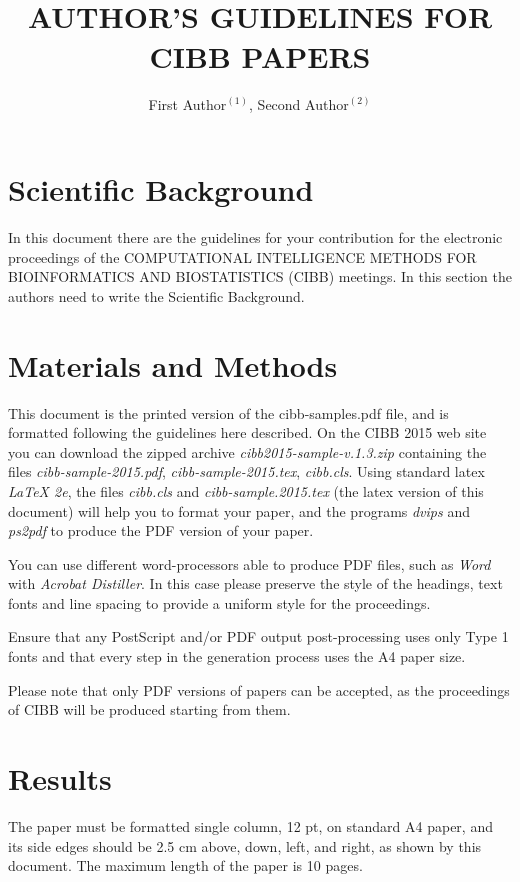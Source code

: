\documentclass[12pt,a4paper]{cibb}
\title{\large $\ $\\ \bf AUTHOR'S GUIDELINES FOR CIBB PAPERS}
\author{ First Author$^{(1)}$, Second Author$^{(2)}$}
\begin{document}
\thispagestyle{myheadings}
\pagestyle{myheadings}



\section{\bf Scientific Background}

In  this   document  there  are  the  guidelines   for  your  contribution
for the electronic proceedings of the COMPUTATIONAL INTELLIGENCE METHODS
FOR BIOINFORMATICS AND BIOSTATISTICS (CIBB) meetings. In this section the authors need to write the Scientific Background.


\section{\bf Materials and Methods}

This document is  the printed version of the cibb-samples.pdf file, and
is formatted following the guidelines here described. On the CIBB 2015 web site
 you can download the  zipped
archive {\it cibb2015-sample-v.1.3.zip} containing the files  {\it cibb-sample-2015.pdf}, {\it cibb-sample-2015.tex},
{\it cibb.cls}.
Using standard  latex  {\it LaTeX 2e}, the files
 {\it cibb.cls} and {\it cibb-sample.2015.tex}
(the  latex version  of this document) will help you to format your paper, and the
programs {\it dvips} and {\it  ps2pdf} to produce the PDF version of your paper.

You can  use different word-processors  able to produce  PDF files,
such  as {\it Word} with {\it Acrobat Distiller}.  In  this  case please  preserve the  style of  the
headings, text fonts  and line spacing to provide  a uniform style for
the proceedings.

Ensure that any PostScript and/or PDF output post-processing
 uses only Type 1 fonts and that every step in the generation
 process uses the A4 paper size.


Please note that only PDF versions of papers can be accepted, as the
proceedings of CIBB will be produced starting  from them.



\section{\bf Results}

The paper  must be formatted  single column, 12 pt,  on standard A4
paper, and its side edges should be 2.5 cm above, down, left, and right,
as shown by this document. The maximum length of  the paper is 10 pages.
\end{document}
